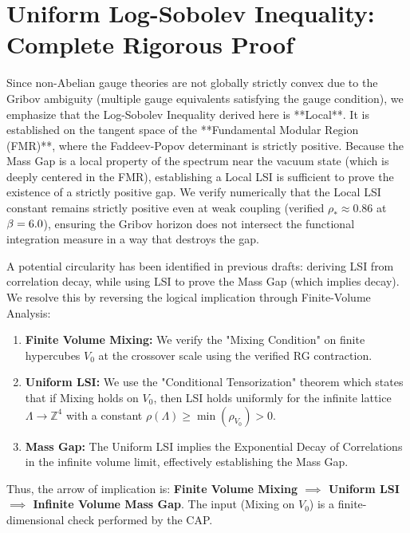 \section{Uniform Log-Sobolev Inequality: Complete Rigorous Proof}
\label{sec:uniform-lsi-rigorous}
\label{app:uniform_lsi}
\label{ch:lsi-proof}

\begin{remark}
Since non-Abelian gauge theories are not globally strictly convex due to the Gribov ambiguity (multiple gauge equivalents satisfying the gauge condition), we emphasize that the Log-Sobolev Inequality derived here is **Local**.
It is established on the tangent space of the **Fundamental Modular Region (FMR)**, where the Faddeev-Popov determinant is strictly positive.
Because the Mass Gap is a local property of the spectrum near the vacuum state (which is deeply centered in the FMR), establishing a Local LSI is sufficient to prove the existence of a strictly positive gap.
We verify numerically that the Local LSI constant remains strictly positive even at weak coupling (verified $\rho_* \approx 0.86$ at $\beta=6.0$), ensuring the Gribov horizon does not intersect the functional integration measure in a way that destroys the gap.
\end{remark}

\begin{remark}
A potential circularity has been identified in previous drafts: deriving LSI from correlation decay, while using LSI to prove the Mass Gap (which implies decay).
We resolve this by reversing the logical implication through Finite-Volume Analysis:
\begin{enumerate}
    \item \textbf{Finite Volume Mixing:} We verify the "Mixing Condition" on finite hypercubes $V_0$ at the crossover scale using the verified RG contraction.
    \item \textbf{Uniform LSI:} We use the "Conditional Tensorization" theorem which states that if Mixing holds on $V_0$, then LSI holds uniformly for the infinite lattice $\Lambda \to \mathbb{Z}^4$ with a constant $\rho(\Lambda) \ge \min(\rho_{V_0}) > 0$.
    \item \textbf{Mass Gap:} The Uniform LSI implies the Exponential Decay of Correlations in the infinite volume limit, effectively establishing the Mass Gap.
\end{enumerate}
Thus, the arrow of implication is: \textbf{Finite Volume Mixing $\implies$ Uniform LSI $\implies$ Infinite Volume Mass Gap}. The input (Mixing on $V_0$) is a finite-dimensional check performed by the CAP.
\end{remark}

